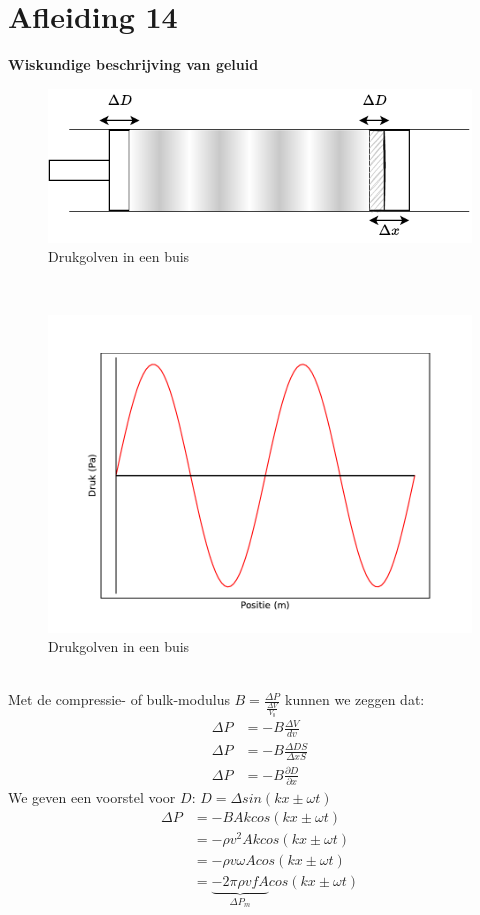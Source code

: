 \documentclass[a4paper,kul]{kulakarticle} %
\begin{document}
\section{Afleiding 14}
\textbf{Wiskundige beschrijving van geluid}\\
\begin{figure}[h]
	\centering
	\includegraphics[width=0.7\linewidth]{WiskundigeBeschrijving}
	\caption[Drukgolven]{Drukgolven in een buis}
	\label{fig:drukgolvenbuis}
\end{figure}\\
\begin{figure}[h]
	\centering
	\includegraphics[width=0.5\linewidth]{Drukinbuis}
	\caption[Drukgolven]{Drukgolven in een buis}
	\label{fig:drukgolvenbuisgrafiek}
\end{figure}\\

Met de compressie- of bulk-modulus $B = \frac{\Delta P}{\frac{\Delta V}{V_0}}$ kunnen we zeggen dat:
\begin{align*}
	\Delta P &= -B \frac{\Delta V}{dv}\\
	\Delta P &= -B \frac{\Delta DS}{\Delta xS}\\
	\Delta P &= -B \frac{\partial D}{\partial x}
\end{align*}
We geven een voorstel voor $D$: $D = \Delta sin(kx\pm \omega t)$
\begin{align*}
	\Delta P &= -BAkcos(kx\pm \omega t)\\
	&= -\rho v^2Akcos(kx\pm \omega t)\\
	&= -\rho v\omega Acos(kx\pm \omega t)\\
	&= \underbrace{-2\pi\rho vfA}_{\Delta P_m} cos(kx\pm \omega t)
\end{align*}
\newpage
\end{document}
